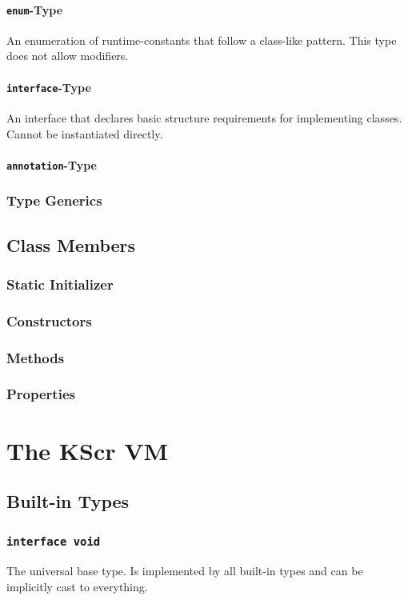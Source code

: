 \documentclass{docs}
\begin{document}
    \paragraph{\texttt{enum}-Type}
    An enumeration of runtime-constants that follow a class-like pattern.
    This type does not allow modifiers.
    \paragraph{\texttt{interface}-Type}
    An interface that declares basic structure requirements for implementing classes.
    Cannot be instantiated directly.
    \paragraph{\texttt{annotation}-Type}
    \subsubsection{Type Generics}
    \subsection{Class Members}
    \subsubsection{Static Initializer}
    \subsubsection{Constructors}
    \subsubsection{Methods}
    \subsubsection{Properties}
    \pagebreak
    \section{The KScr VM}
    \subsection{Built-in Types}
    \subsubsection{\texttt{interface void}}
    \label{typeVoid}
    The universal base type. Is implemented by all built-in types and can be implicitly cast to everything.
\end{document}
